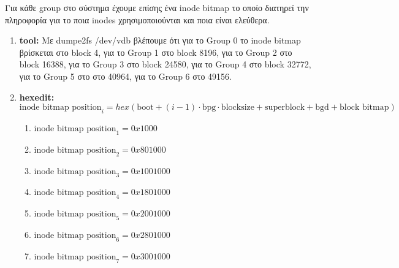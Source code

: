 \documentclass{article}
\begin{document}
Για κάθε group στο σύστημα έχουμε επίσης ένα inode bitmap το οποίο διατηρεί την πληροφορία για το
ποια inodes χρησιμοποιούνται και ποια είναι ελεύθερα.
\begin{enumerate}
    \item{\textbf{tool:} Με dumpe2fs /dev/vdb βλέπουμε ότι για το Group 0 το inode bitmap βρίσκεται στο block 4, για το 
        Group 1 στο block 8196, για το Group 2 στο block 16388, για το Group 3 στο block 24580, για το Group 4 στο block 32772,
        για το Group 5 στο στο 40964, για το Group 6 στο 49156.}
    \item{\textbf{hexedit:} $\text{inode bitmap position}_{i} = hex(\text{boot}+(i-1)\cdot\text{bpg}\cdot \text{blocksize}
            + \text{superblock} + \text{bgd} + \text{block bitmap})$
    \begin{enumerate}
            \item{$\text{inode bitmap position}_{1} = 0x1000$}
            \item{$\text{inode bitmap position}_{2} = 0x801000$}
            \item{$\text{inode bitmap position}_{3} = 0x1001000$}
            \item{$\text{inode bitmap position}_{4} = 0x1801000$}
            \item{$\text{inode bitmap position}_{5} = 0x2001000$}
            \item{$\text{inode bitmap position}_{6} = 0x2801000$}
            \item{$\text{inode bitmap position}_{7} = 0x3001000$}
    \end{enumerate}}
\end{enumerate}
\end{document}
